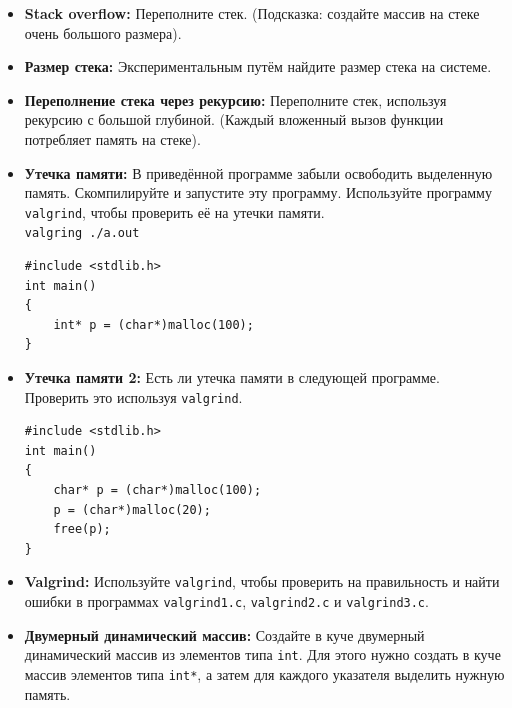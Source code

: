 \documentclass{article}
\begin{document}
\begin{itemize}
\item \textbf{Stack overflow:} Переполните стек. (Подсказка: создайте массив на стеке очень большого размера).
\item \textbf{Размер стека:} Экспериментальным путём найдите размер стека на системе.
\item \textbf{Переполнение стека через рекурсию:} Переполните стек, используя рекурсию с большой глубиной. (Каждый вложенный вызов функции потребляет память на стеке).
\item \textbf{Утечка памяти:}
В приведённой программе забыли освободить выделенную память. Скомпилируйте и запустите эту программу. Используйте программу \texttt{valgrind}, чтобы проверить её на утечки памяти.\\
\texttt{valgring ./a.out}
\begin{lstlisting}
#include <stdlib.h>
int main()
{
	int* p = (char*)malloc(100);
}
\end{lstlisting} 
\item \textbf{Утечка памяти 2:}
Есть ли утечка памяти в следующей программе. Проверить это используя \texttt{valgrind}.
\begin{lstlisting}
#include <stdlib.h>
int main()
{
	char* p = (char*)malloc(100);
	p = (char*)malloc(20);
	free(p);
}
\end{lstlisting} 
\item \textbf{Valgrind:} Используйте \texttt{valgrind}, чтобы проверить на правильность и найти ошибки в программах \texttt{valgrind1.c}, \texttt{valgrind2.c} и \texttt{valgrind3.c}.
\item \textbf{Двумерный динамический массив:} Создайте в куче двумерный динамический массив из элементов типа \texttt{int}. Для этого нужно создать в куче массив элементов типа \texttt{int*}, а затем для каждого указателя выделить нужную память. 
\end{itemize}
\end{document}
